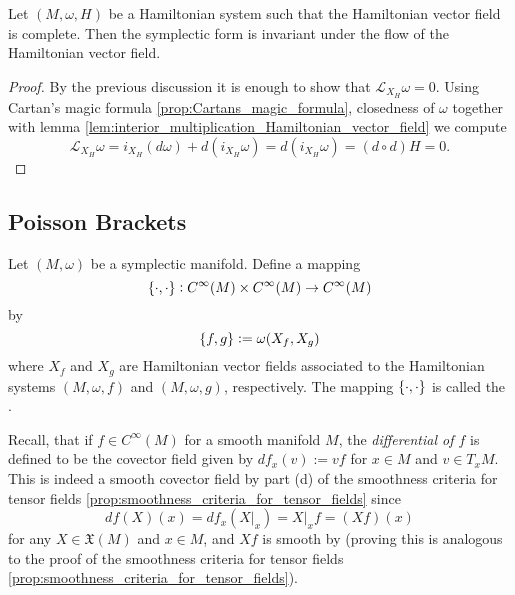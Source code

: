 \begin{proposition}
	Let $(M,\omega,H)$ be a Hamiltonian system such that the Hamiltonian vector field is complete. Then the symplectic form is invariant under the flow of the Hamiltonian vector field.
\end{proposition}

\begin{proof}
	By the previous discussion it is enough to show that $\mathcal{L}_{X_H}\omega = 0$. Using Cartan's magic formula \ref{prop:Cartans_magic_formula}, closedness of $\omega$ together with lemma \ref{lem:interior_multiplication_Hamiltonian_vector_field} we compute
	\begin{equation*}
		\mathcal{L}_{X_H}\omega = i_{X_H}(d\omega) + d(i_{X_H}\omega) = d(i_{X_H}\omega) = (d \circ d)H = 0.
	\end{equation*}
\end{proof}

\subsection*{Poisson Brackets}

\begin{definition}
	Let $(M,\omega)$ be a symplectic manifold. Define a mapping 
	\begin{equation*}
		\cbr{\cdot,\cdot} : C^\infty(M) \times C^\infty(M) \to C^\infty(M)
	\end{equation*}
	\noindent by
	\begin{equation*}
		\cbr{f,g} := \omega(X_f,X_g)
	\end{equation*}
	\noindent where $X_f$ and $X_g$ are Hamiltonian vector fields associated to the Hamiltonian systems $(M,\omega,f)$ and $(M,\omega,g)$, respectively. The mapping $\cbr{\cdot,\cdot}$ is called the .	
\end{definition}

Recall, that if $f \in C^\infty(M)$ for a smooth manifold $M$, the \emph{differential of $f$} is defined to be the covector field given by $df_x(v) := vf$ for $x \in M$ and $v \in T_xM$. This is indeed a smooth covector field by part (d) of the smoothness criteria for tensor fields \ref{prop:smoothness_criteria_for_tensor_fields} since
\begin{equation}
	\label{eq:differential_vector_field}
	df(X)(x) = df_x(X\vert_x) = X\vert_x f = (Xf)(x)
\end{equation}
\noindent for any $X \in \mathfrak{X}(M)$ and $x \in M$, and $Xf$ is smooth by \cite[180]{lee:smooth_manifolds:2013} (proving this is analogous to the proof of the smoothness criteria for tensor fields \ref{prop:smoothness_criteria_for_tensor_fields}).

